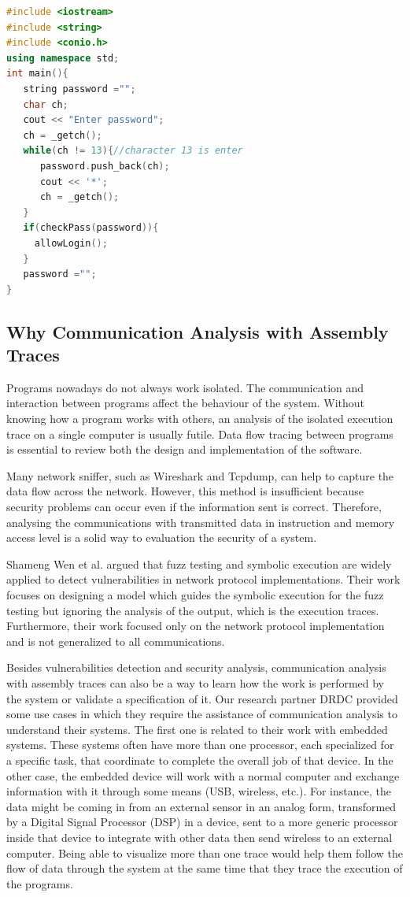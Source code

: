 \begin{lstlisting}[language=C++, caption= Password Fetching Example ]
#include <iostream>
#include <string>
#include <conio.h>
using namespace std;
int main(){
   string password ="";
   char ch;
   cout << "Enter password";
   ch = _getch();
   while(ch != 13){//character 13 is enter
      password.push_back(ch);
      cout << '*';
      ch = _getch();
   }   
   if(checkPass(password)){
     allowLogin();
   }  
   password ="";
}
\end{lstlisting}

\subsection{Why Communication Analysis with Assembly Traces}
Programs nowadays do not always work isolated. The communication and interaction between programs affect the behaviour of the system. Without knowing how a program works with others, an analysis of the isolated execution trace on a single computer is usually futile. Data flow tracing between programs is essential to review both the design and implementation of the software.

Many network sniffer, such as Wireshark\cite{_wireshark_????} and Tcpdump\cite{tcpdump_tcpdump/libpcap_????}, can help to capture the data flow across the network. However, this method  is insufficient because security problems can occur even if the information sent is correct. Therefore, analysing the communications with transmitted data in instruction and memory access level is a solid way to evaluation the security of a system.

Shameng Wen et al. argued that fuzz testing and symbolic execution are widely applied to detect vulnerabilities in network protocol implementations. Their work focuses on designing a model which guides the symbolic execution for the fuzz testing \cite{wen2017model} but ignoring the analysis of the output, which is the execution traces. Furthermore, their work focused only on the network protocol implementation and is not generalized to all communications.

Besides vulnerabilities detection and security analysis, communication analysis with assembly traces can also be a way to learn how the work is performed by the system or validate a specification of it. Our research partner DRDC provided some use cases in which they require the assistance of communication analysis to understand their systems. The first one is related to their work with embedded systems. These systems often have more than one processor, each specialized for a specific task, that coordinate to complete the overall job of that device.  In the other case, the embedded device will work with a normal computer and exchange information with it through some means
(USB, wireless, etc.).  For instance, the data might be coming in from an external sensor in an analog form, transformed by a Digital Signal Processor (DSP) in a device, sent to a more generic processor inside that device to integrate with other data then send wireless to an external computer. Being able to visualize more than one trace would help them follow the flow of data through the system at the same time that they trace the execution of the programs.

